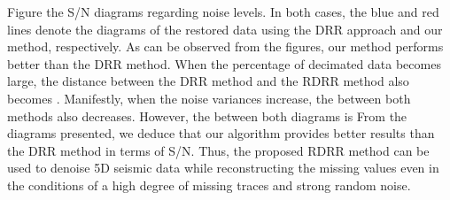 Figure  the S/N diagrams regarding noise levels. In both cases, the blue and red lines denote the diagrams of the restored data using the DRR approach and our method, respectively. As can be observed from the figures, our method performs better than the DRR method. When the percentage of decimated data becomes large, the distance between the DRR method and the RDRR method also becomes . Manifestly, when the noise variances increase, the  between both methods also decreases. However, the  between both diagrams is  From the diagrams presented, we deduce that our algorithm provides better results than the DRR method in terms of S/N. Thus, the proposed RDRR method can be used to denoise 5D seismic data while reconstructing the missing values even in the conditions of a high degree of missing traces and strong random noise.

